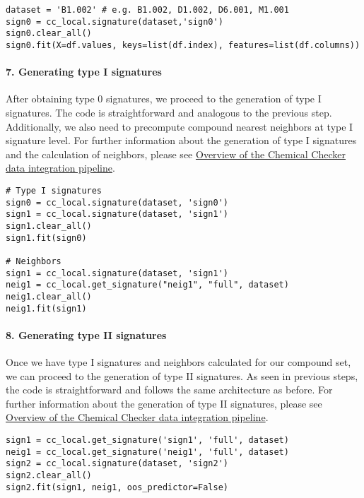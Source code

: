 \begin{lstlisting}
dataset = 'B1.002' # e.g. B1.002, D1.002, D6.001, M1.001
sign0 = cc_local.signature(dataset,'sign0')
sign0.clear_all()
sign0.fit(X=df.values, keys=list(df.index), features=list(df.columns))
\end{lstlisting}


\paragraph{7. Generating type I signatures} \leavevmode

After obtaining type 0 signatures, we proceed to the generation of type I signatures. The code is straightforward and analogous to the previous step. Additionally, we also need to precompute compound nearest neighbors at type I signature level. For further information about the generation of type I signatures and the calculation of neighbors, please see \hyperref[Overview of the Chemical Checker data integration pipeline]{Overview of the Chemical Checker data integration pipeline}. \\

\begin{lstlisting}
# Type I signatures
sign0 = cc_local.signature(dataset, 'sign0')
sign1 = cc_local.signature(dataset, 'sign1')
sign1.clear_all()
sign1.fit(sign0)

# Neighbors
sign1 = cc_local.signature(dataset, 'sign1')
neig1 = cc_local.get_signature("neig1", "full", dataset)
neig1.clear_all()
neig1.fit(sign1)
\end{lstlisting}

\paragraph{8. Generating type II signatures} \leavevmode

Once we have type I signatures and neighbors calculated for our compound set, we can proceed to the generation of type II signatures. As seen in previous steps, the code is straightforward and follows the same architecture as before. For further information about the generation of type II signatures, please see \hyperref[Overview of the Chemical Checker data integration pipeline]{Overview of the Chemical Checker data integration pipeline}. \\

\begin{lstlisting}
sign1 = cc_local.get_signature('sign1', 'full', dataset)
neig1 = cc_local.get_signature('neig1', 'full', dataset)
sign2 = cc_local.signature(dataset, 'sign2')
sign2.clear_all()
sign2.fit(sign1, neig1, oos_predictor=False)
\end{lstlisting}


